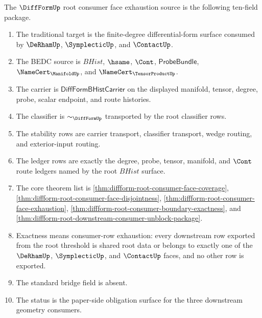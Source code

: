 \begin{definition}
\label{def:diffform-root-consumer-face-exhaustion-source}
The $\DiffFormUp$ root consumer face exhaustion source is the following
ten-field package.
\begin{enumerate}
  \item The traditional target is the finite-degree differential-form surface
  consumed by $\DeRhamUp$, $\SymplecticUp$, and $\ContactUp$.
  \item The BEDC source is $BHist$, $\hsame$, $\Cont$,
  $\mathsf{ProbeBundle}$, $\NameCert_{\ManifoldUp}$, and
  $\NameCert_{\TensorProductUp}$.
  \item The carrier is $\mathsf{DiffFormBHistCarrier}$ on the displayed
  manifold, tensor, degree, probe, scalar endpoint, and route histories.
  \item The classifier is $\sim_{\DiffFormUp}$ transported by the root
  classifier rows.
  \item The stability rows are carrier transport, classifier transport, wedge
  routing, and exterior-input routing.
  \item The ledger rows are exactly the degree, probe, tensor, manifold, and
  $\Cont$ route ledgers named by the root $BHist$ surface.
  \item The core theorem list is
  \autoref{thm:diffform-root-consumer-face-coverage},
  \autoref{thm:diffform-root-consumer-face-disjointness},
  \autoref{thm:diffform-root-consumer-face-exhaustion},
  \autoref{thm:diffform-root-consumer-boundary-exactness}, and
  \autoref{thm:diffform-root-downstream-consumer-unblock-package}.
  \item Exactness means consumer-row exhaustion: every downstream row exported
  from the root threshold is shared root data or belongs to exactly one of the
  $\DeRhamUp$, $\SymplecticUp$, and $\ContactUp$ faces, and no other row is
  exported.
  \item The standard bridge field is absent.
  \item The status is the paper-side obligation surface for the three
  downstream geometry consumers.
\end{enumerate}
\end{definition}

